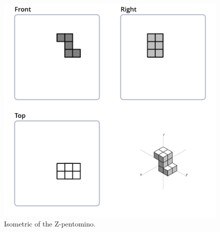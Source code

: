 \begin{figure}
	\centering
	\includegraphics[scale=0.3]{iso_diagrams/z.png}
	\caption{Isometric of the Z-pentomino.}
  \label{fig:iso-pent-z}
\end{figure}
